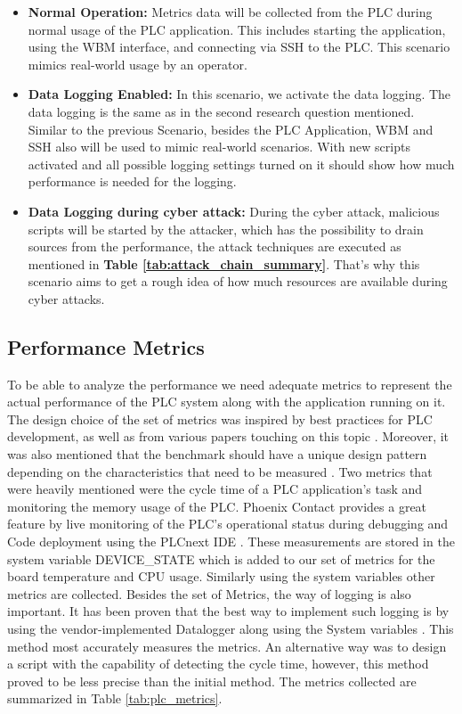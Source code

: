 \documentclass[Master,BMR,english]{twbook}
\begin{document}
\begin{itemize}
    \item \textbf{Normal Operation:} Metrics data will be collected from the PLC during normal usage of the PLC application. This includes starting the application, using the WBM interface, and connecting via SSH to the PLC. This scenario mimics real-world usage by an operator.
    \item \textbf{Data Logging Enabled:} In this scenario, we activate the data logging. The data logging is the same as in the second research question mentioned. Similar to the previous Scenario, besides the PLC Application, WBM and SSH also will be used to mimic real-world scenarios. With new scripts activated and all possible logging settings turned on it should show how much performance is needed for the logging. 
    \item \textbf{Data Logging during cyber attack:} During the cyber attack, malicious scripts will be started by the attacker, which has the possibility to drain sources from the performance, the attack techniques are executed as mentioned in \textbf{Table \ref{tab:attack_chain_summary}}. That’s why this scenario aims to get a rough idea of how much resources are available during cyber attacks.
\end{itemize}

\subsection{Performance Metrics}

To be able to analyze the performance we need adequate metrics to represent the actual performance of the PLC system along with the application running on it. The design choice of the set of metrics was inspired by best practices for PLC development, as well as from various papers touching on this topic \cite{bolton_programmable_2007}\cite{nistir_8089}. Moreover, it was also mentioned that the benchmark should have a unique design pattern depending on the characteristics that need to be measured \cite{vieira_performance_2024} \cite{tasca_improving_nodate}. Two metrics that were heavily mentioned were the cycle time of a PLC application's task and monitoring the memory usage of the PLC. Phoenix Contact provides a great feature by live monitoring of the PLC's operational status during debugging and Code deployment using the PLCnext IDE \cite{phoenixcontact_plcnext_engineer}. These measurements are stored in the system variable DEVICE\_STATE which is added to our set of metrics for the board temperature and CPU usage. Similarly using the system variables other metrics are collected. Besides the set of Metrics, the way of logging is also important. It has been proven that the best way to implement such logging is by using the vendor-implemented Datalogger along using the System variables \cite{plcnext_datalogger}. This method most accurately measures the metrics. An alternative way was to design a script with the capability of detecting the cycle time, however, this method proved to be less precise than the initial method. The metrics collected are summarized in Table \ref{tab:plc_metrics}.
\end{document}
